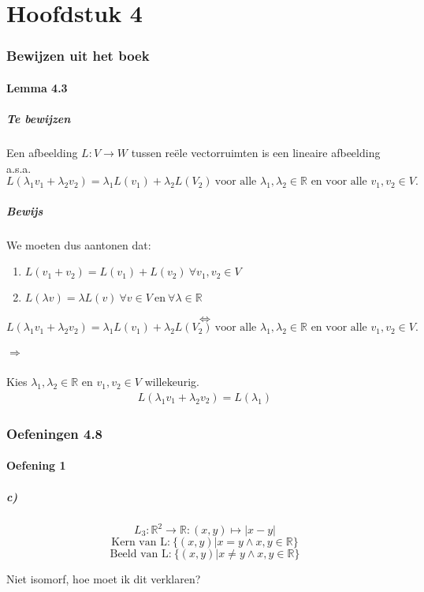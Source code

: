 \documentclass[lineaire_algebra_oplossingen.tex]{subfiles}
\begin{document}
\part{Hoofdstuk 4}
\section{Bewijzen uit het boek}
\subsection{Lemma 4.3}
\subsubsection*{Te bewijzen}
Een afbeelding $L:V\rightarrow W$ tussen re\"ele vectorruimten is een lineaire afbeelding a.s.a.
$$L(\lambda_1v_1+\lambda_2v_2) = \lambda_1L(v_1)+\lambda_2L(V_2)\ \text{voor alle $\lambda_1,\lambda_2 \in \mathbb{R}$ en voor alle $v_1,v_2 \in V$}.$$
\subsubsection*{Bewijs}
We moeten dus aantonen dat:
\begin{enumerate}
\item $L(v_1+v_2) = L(v_1) + L(v_2) \ \forall v_1,v_2 \in V$
\item $L(\lambda v) = \lambda L(v) \ \forall v \in V \ \text{en} \ \forall \lambda \in \mathbb{R}$
\end{enumerate}
$$\Leftrightarrow$$
$$L(\lambda_1v_1+\lambda_2v_2) = \lambda_1L(v_1)+\lambda_2L(V_2)\ \text{voor alle $\lambda_1,\lambda_2 \in \mathbb{R}$ en voor alle $v_1,v_2 \in V$}.$$
\subsubsection*{$\Rightarrow$}
Kies $\lambda_1,\lambda_2 \in \mathbb{R}$ en $v_1,v_2 \in V$ willekeurig.
\begin{align*}
L(\lambda_1 v_1 + \lambda_2 v_2) = L(\lambda_1) \tag{test}
\end{align*}
\section{Oefeningen 4.8}
\subsection{Oefening 1}
\subsubsection{c)}
$$
L_3:\mathbb{R}^2\rightarrow\mathbb{R}:(x,y)\mapsto |x-y|
$$
$$
\text{Kern van L:} \ \{(x,y)|x=y \wedge x,y \in \mathbb{R} \}
$$
$$
\text{Beeld van L:} \ \{(x,y)|x\neq y \wedge x,y \in \mathbb{R} \}
$$
\begin{center}
Niet isomorf, hoe moet ik dit verklaren?
\end{center}
\end{document}
